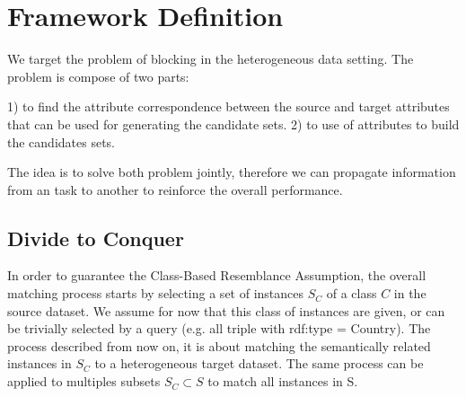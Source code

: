 
\section{Framework Definition}
We target the problem of blocking in the heterogeneous data setting. The problem is compose of two parts:

1) to find the attribute correspondence between the source and target attributes that can be used for generating the candidate sets.
2) to use of attributes to build the candidates sets. 

The idea is to solve both problem jointly, therefore we can propagate information from an task to another to reinforce the overall performance.



\subsection{Divide to Conquer} 
In order to guarantee the Class-Based Resemblance Assumption, the overall matching process starts by selecting a set of instances $S_C$ of a class $C$ in the source dataset. We assume for now that this class of instances are given, or can be trivially selected by a query (e.g. all triple with rdf:type = Country). The process described from now on, it is about matching the semantically related instances in $S_C$ to a heterogeneous target dataset. The same process can be applied to multiples subsets $S_C \subset S$  to match all instances in S.

 

